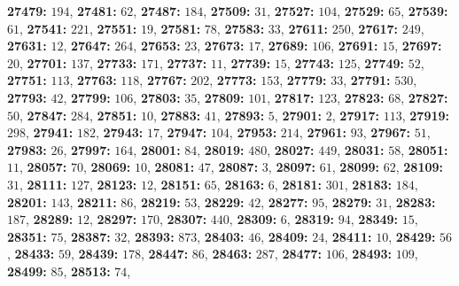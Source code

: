 \textsf{\bfseries 27479:} $194$, \textsf{\bfseries 27481:} $62$, \textsf{\bfseries 27487:} $184$, \textsf{\bfseries 27509:} $31$, \textsf{\bfseries 27527:} $104$, \textsf{\bfseries 27529:} $65$, \textsf{\bfseries 27539:} $61$, \textsf{\bfseries 27541:} $221$, \textsf{\bfseries 27551:} $19$, \textsf{\bfseries 27581:} $78$, \textsf{\bfseries 27583:} $33$, \textsf{\bfseries 27611:} $250$, \textsf{\bfseries 27617:} $249$, \textsf{\bfseries 27631:} $12$, \textsf{\bfseries 27647:} $264$, \textsf{\bfseries 27653:} $23$, \textsf{\bfseries 27673:} $17$, \textsf{\bfseries 27689:} $106$, \textsf{\bfseries 27691:} $15$, \textsf{\bfseries 27697:} $20$, \textsf{\bfseries 27701:} $137$, \textsf{\bfseries 27733:} $171$, \textsf{\bfseries 27737:} $11$, \textsf{\bfseries 27739:} $15$, \textsf{\bfseries 27743:} $125$, \textsf{\bfseries 27749:} $52$, \textsf{\bfseries 27751:} $113$, \textsf{\bfseries 27763:} $118$, \textsf{\bfseries 27767:} $202$, \textsf{\bfseries 27773:} $153$, \textsf{\bfseries 27779:} $33$, \textsf{\bfseries 27791:} $530$, \textsf{\bfseries 27793:} $42$, \textsf{\bfseries 27799:} $106$, \textsf{\bfseries 27803:} $35$, \textsf{\bfseries 27809:} $101$, \textsf{\bfseries 27817:} $123$, \textsf{\bfseries 27823:} $68$, \textsf{\bfseries 27827:} $50$, \textsf{\bfseries 27847:} $284$, \textsf{\bfseries 27851:} $10$, \textsf{\bfseries 27883:} $41$, \textsf{\bfseries 27893:} $5$, \textsf{\bfseries 27901:} $2$, \textsf{\bfseries 27917:} $113$, \textsf{\bfseries 27919:} $298$, \textsf{\bfseries 27941:} $182$, \textsf{\bfseries 27943:} $17$, \textsf{\bfseries 27947:} $104$, \textsf{\bfseries 27953:} $214$, \textsf{\bfseries 27961:} $93$, \textsf{\bfseries 27967:} $51$, \textsf{\bfseries 27983:} $26$, \textsf{\bfseries 27997:} $164$, \textsf{\bfseries 28001:} $84$, \textsf{\bfseries 28019:} $480$, \textsf{\bfseries 28027:} $449$, \textsf{\bfseries 28031:} $58$, \textsf{\bfseries 28051:} $11$, \textsf{\bfseries 28057:} $70$, \textsf{\bfseries 28069:} $10$, \textsf{\bfseries 28081:} $47$, \textsf{\bfseries 28087:} $3$, \textsf{\bfseries 28097:} $61$, \textsf{\bfseries 28099:} $62$, \textsf{\bfseries 28109:} $31$, \textsf{\bfseries 28111:} $127$, \textsf{\bfseries 28123:} $12$, \textsf{\bfseries 28151:} $65$, \textsf{\bfseries 28163:} $6$, \textsf{\bfseries 28181:} $301$, \textsf{\bfseries 28183:} $184$, \textsf{\bfseries 28201:} $143$, \textsf{\bfseries 28211:} $86$, \textsf{\bfseries 28219:} $53$, \textsf{\bfseries 28229:} $42$, \textsf{\bfseries 28277:} $95$, \textsf{\bfseries 28279:} $31$, \textsf{\bfseries 28283:} $187$, \textsf{\bfseries 28289:} $12$, \textsf{\bfseries 28297:} $170$, \textsf{\bfseries 28307:} $440$, \textsf{\bfseries 28309:} $6$, \textsf{\bfseries 28319:} $94$, \textsf{\bfseries 28349:} $15$, \textsf{\bfseries 28351:} $75$, \textsf{\bfseries 28387:} $32$, \textsf{\bfseries 28393:} $873$, \textsf{\bfseries 28403:} $46$, \textsf{\bfseries 28409:} $24$, \textsf{\bfseries 28411:} $10$, \textsf{\bfseries 28429:} $56$, \textsf{\bfseries 28433:} $59$, \textsf{\bfseries 28439:} $178$, \textsf{\bfseries 28447:} $86$, \textsf{\bfseries 28463:} $287$, \textsf{\bfseries 28477:} $106$, \textsf{\bfseries 28493:} $109$, \textsf{\bfseries 28499:} $85$, \textsf{\bfseries 28513:} $74$, 
